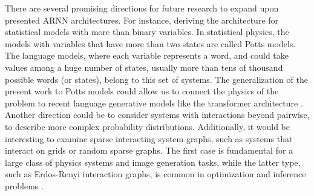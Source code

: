\documentclass[aps,physrev,10pt,floatfix,reprint]{revtex4-2}
\begin{document}
There are several promising directions for future research to expand upon presented ARNN architectures. For instance, deriving the architecture for statistical models with more than binary variables. In statistical physics, the models with variables that have more than two states are called Potts models. The language models, where each variable represents a word, and could take values among a huge number of states, usually more than tens of thousand possible words (or states), belong to this set of systems. The generalization of the present work to Potts models could allow us to connect the physics of the problem to recent language generative models like the transformer architecture \cite{https://doi.org/10.48550/arxiv.2005.14165}. Another direction could be to consider systems with interactions beyond pairwise, to describe more complex probability distributions. Additionally, it would be interesting to examine sparse interacting system graphs, such as systems that interact on grids or random sparse graphs. The first case is fundamental for a large class of physics systems and image generation tasks, while the latter type, such as Erdos-Renyi interaction graphs, is common in optimization \cite{doi:10.1126/science.1073287} and inference problems \cite{Biazzo2022}. 
%

\end{document}
